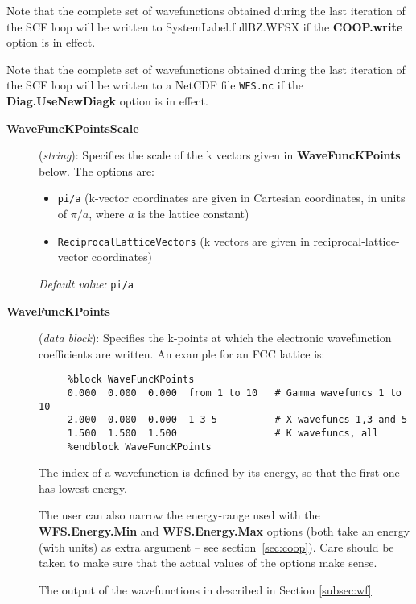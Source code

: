 \documentclass[11pt]{article}
\begin{document}
Note that the complete set of wavefunctions obtained during the last
iteration of the SCF loop will be written to SystemLabel.fullBZ.WFSX
if the {\bf COOP.write} option is in effect.

Note that the complete set of wavefunctions obtained during the last
iteration of the SCF loop will be written to a NetCDF file
{\tt WFS.nc} if the {\bf Diag.UseNewDiagk} option is in effect.

\begin{description}

\item[{\bf WaveFuncKPointsScale}] ({\it string}):
Specifies the scale of the k vectors given in
{\bf WaveFuncKPoints} below.
The options are:
\begin{itemize}
\item {\tt pi/a} (k-vector coordinates are given in Cartesian
coordinates, in units of $\pi/a$, where $a$ is the lattice constant)
\item {\tt ReciprocalLatticeVectors} (k vectors are given in
reciprocal-lattice-vector coordinates)
\end{itemize}

{\it Default value:} {\tt pi/a}


\item[{\bf WaveFuncKPoints}] ({\it data block}):
Specifies the k-points at which the electronic wavefunction
coefficients are written.
An example for an FCC lattice is:

\begin{verbatim}
     %block WaveFuncKPoints
     0.000  0.000  0.000  from 1 to 10   # Gamma wavefuncs 1 to 10
     2.000  0.000  0.000  1 3 5          # X wavefuncs 1,3 and 5
     1.500  1.500  1.500                 # K wavefuncs, all
     %endblock WaveFuncKPoints
\end{verbatim}

The index of a wavefunction is defined by its energy, so that the
first one has lowest energy.

The user can also narrow the energy-range used with the {\bf
  WFS.Energy.Min} and {\bf WFS.Energy.Max} options (both take an
energy (with units) as extra argument -- see
section~\ref{sec:coop}). Care should be taken to make sure that the
actual values of the options make sense.

The output of the wavefunctions in described in Section \ref{subsec:wf}


\end{description}
\end{document}
